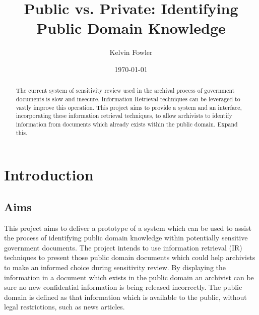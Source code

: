 \documentclass{l4proj}
\title{Public vs. Private: \newline Identifying Public Domain Knowledge}
\author{Kelvin Fowler}
\date{\today}
\begin{document}
\maketitle

\begin{abstract}
The current system of sensitivity review used in the archival process of government documents is slow and insecure. Information Retrieval techniques can be leveraged to vastly improve this operation. This project aims to provide a system and an interface, incorporating these information retrieval techniques, to allow archivists to identify information from documents which already exists within the public domain.
Expand this.
\end{abstract}


\educationalconsent

\tableofcontents

\chapter{Introduction}

\section{Aims}
This project aims to deliver a prototype of a system which can be used to assist the process of identifying public domain knowledge within potentially sensitive government documents. The project intends to use information retrieval (IR) techniques to present those public domain documents which could help archivists to make an informed choice during sensitivity review. By displaying the information in a document which exists in the public domain an archivist can be sure no new confidential information is being released incorrectly.
The public domain is defined as that information which is available to the public, without legal restrictions, such as news articles.
\end{document}
